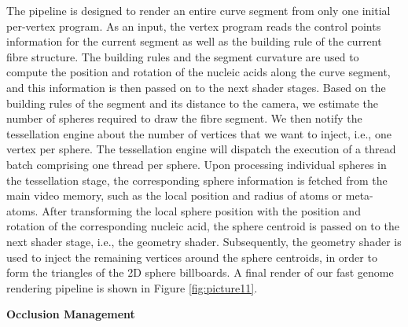 The pipeline is designed to render an entire curve segment from only one initial per-vertex program.
As an input, the vertex program reads the control points information for the current segment as well as the building rule of the current fibre structure.
The building rules and the segment curvature are used to compute the position and rotation of the nucleic acids along the curve segment, and this information is then passed on to the next shader stages.
Based on the building rules of the segment and its distance to the camera, we estimate the number of spheres required to draw the fibre segment.
We then notify the tessellation engine about the number of vertices that we want to inject, i.e., one vertex per sphere.
The tessellation engine will dispatch the execution of a thread batch comprising one thread per sphere.
Upon processing individual spheres in the tessellation stage, the corresponding sphere information is fetched from the main video memory, such as the local position and radius of atoms or meta-atoms.
After transforming the local sphere position with the position and rotation of the corresponding nucleic acid, the sphere centroid is passed on to the next shader stage, i.e., the geometry shader.
Subsequently, the geometry shader is used to inject the remaining vertices around the sphere centroids, in order to form the triangles of the 2D sphere billboards.
A final render of our fast genome rendering pipeline is shown in Figure \ref{fig:picture11}.



\textbf{Occlusion Management}


